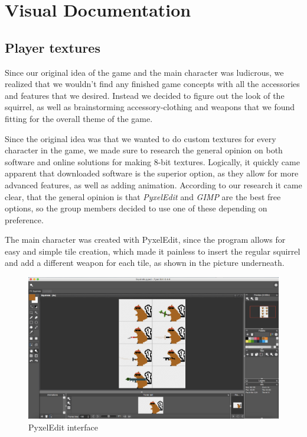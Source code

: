\documentclass[12p]{article}
\begin{document}

\clearpage
\section{Visual Documentation} \label{VisualDocumentation}

\subsection{Player textures}
Since our original idea of the game and the main character was ludicrous, we realized that we wouldn’t find any finished game concepts with all the accessories and features that we desired. Instead we decided to figure out the look of the squirrel, as well as brainstorming accessory-clothing and weapons that we found fitting for the overall theme of the game.

Since the original idea was that we wanted to do custom textures for every character in the game, we made sure to research the general opinion on both software and online solutions for making 8-bit textures. Logically, it quickly came apparent that downloaded software is the superior option, as they allow for more advanced features, as well as adding animation. According to our research it came clear, that the general opinion is that \emph{PyxelEdit} \cite{PyxelEdit} and \emph{GIMP} \cite{GIMP} are the best free options, so the group members decided to use one of these depending on preference.

The main character was created with PyxelEdit, since the program allows for easy and simple tile creation, which made it painless to insert the regular squirrel and add a different weapon for each tile, as shown in the picture underneath.

\begin{figure}[ht]
  \center
  \includegraphics[width=1\textwidth]{Documentation/Picture1.png}
  \caption{PyxelEdit interface \cite{PyxelEdit}}
  \label{fig:pyxeledit_screenshot}
\end{figure}
\end{document}
